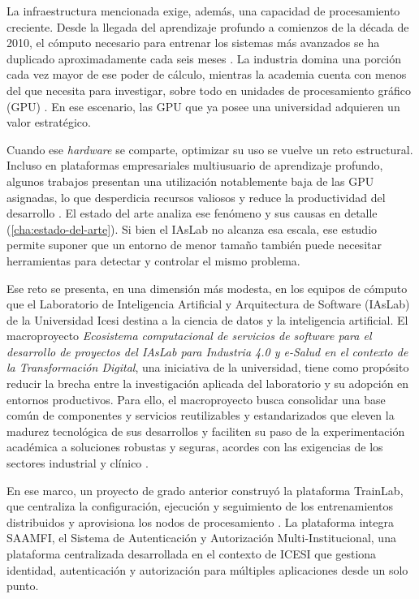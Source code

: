 La infraestructura mencionada exige, además, una capacidad de procesamiento creciente. Desde la llegada del aprendizaje profundo a comienzos de la década de 2010, el cómputo necesario para entrenar los sistemas más avanzados se ha duplicado aproximadamente cada seis meses \citep{sevilla-computetrends-2022}. La industria domina una porción cada vez mayor de ese poder de cálculo, mientras la academia cuenta con menos del que necesita para investigar, sobre todo en unidades de procesamiento gráfico (GPU) \citep{ahmed-industryinfluence-2023}. En ese escenario, las GPU que ya posee una universidad adquieren un valor estratégico.

Cuando ese \emph{hardware} se comparte, optimizar su uso se vuelve un reto estructural. Incluso en plataformas empresariales multiusuario de aprendizaje profundo, algunos trabajos presentan una utilización notablemente baja de las GPU asignadas, lo que desperdicia recursos valiosos y reduce la productividad del desarrollo \citep{gao-lowgpuutilization-2024}. El estado del arte analiza ese fenómeno y sus causas en detalle (\cref{cha:estado-del-arte}). Si bien el IAsLab no alcanza esa escala, ese estudio permite suponer que un entorno de menor tamaño también puede necesitar herramientas para detectar y controlar el mismo problema.

Ese reto se presenta, en una dimensión más modesta, en los equipos de cómputo que el Laboratorio de Inteligencia Artificial y Arquitectura de Software (IAsLab) de la Universidad Icesi destina a la ciencia de datos y la inteligencia artificial. El macroproyecto \emph{Ecosistema computacional de servicios de software para el desarrollo de proyectos del IAsLab para Industria 4.0 y e-Salud en el contexto de la Transformación Digital}, una iniciativa de la universidad, tiene como propósito reducir la brecha entre la investigación aplicada del laboratorio y su adopción en entornos productivos. Para ello, el macroproyecto busca consolidar una base común de componentes y servicios reutilizables y estandarizados que eleven la madurez tecnológica de sus desarrollos y faciliten su paso de la experimentación académica a soluciones robustas y seguras, acordes con las exigencias de los sectores industrial y clínico \citep{tobar-sistemaentrenamiento-2026}.

En ese marco, un proyecto de grado anterior construyó la plataforma TrainLab, que centraliza la configuración, ejecución y seguimiento de los entrenamientos distribuidos y aprovisiona los nodos de procesamiento \citep{tobar-sistemaentrenamiento-2026}. La plataforma integra SAAMFI, el Sistema de Autenticación y Autorización Multi-Institucional, una plataforma centralizada desarrollada en el contexto de ICESI que gestiona identidad, autenticación y autorización para múltiples aplicaciones desde un solo punto.

